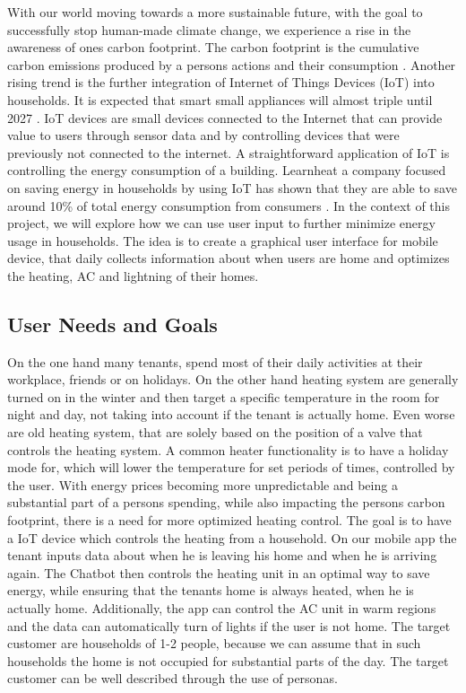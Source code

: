 \documentclass[]{interact}
\theoremstyle{plain}%
\theoremstyle{definition}
\theoremstyle{remark}
\begin{document}
With our world moving towards a more sustainable future, with the goal to successfully stop human-made climate change, we experience a rise in the awareness of ones carbon footprint.
The carbon footprint is the cumulative carbon emissions produced by a persons actions and their consumption \citep*{mulvaney_what_2022}.
Another rising trend is the further integration of Internet of Things Devices (IoT) into households.
It is expected that smart small appliances will almost triple until 2027 \citep*{armstrong_infographic_2022}.
IoT devices are small devices connected to the Internet that can provide value to users through sensor data and by controlling devices that were previously not connected to the internet.
A straightforward application of IoT is controlling the energy consumption of a building.
Learnheat a company focused on saving energy in households by using IoT has shown that they are able to save around 10\% of total energy consumption from consumers \citep*{noauthor_iot_2019}.
In the context of this project, we will explore how we can use user input to further minimize energy usage in households.
The idea is to create a graphical user interface for mobile device, that daily collects information about when users are home and optimizes the heating, AC and lightning of their homes.

\subsection*{User Needs and Goals}

On the one hand many tenants, spend most of their daily activities at their workplace, friends or on holidays.
On the other hand heating system are generally turned on in the winter and then target a specific temperature in the room for night and day, not taking into account if the tenant is actually home.
Even worse are old heating system, that are solely based on the position of a valve that controls the heating system.
A common heater functionality is to have a holiday mode for, which will lower the temperature for set periods of times, controlled by the user.
With energy prices becoming more unpredictable and being a substantial part of a persons spending, while also impacting the persons carbon footprint, there is a need for more optimized heating control.
The goal is to have a IoT device which controls the heating from a household.
On our mobile app the tenant inputs data about when he is leaving his home and when he is arriving again.
The Chatbot then controls the heating unit in an optimal way to save energy, while ensuring that the tenants home is always heated, when he is actually home.
Additionally, the app can control the AC unit in warm regions and the data can automatically turn of lights if the user is not home.
The target customer are households of 1-2 people, because we can assume that in such households the home is not occupied for substantial parts of the day.
The target customer can be well described through the use of personas.
\end{document}
